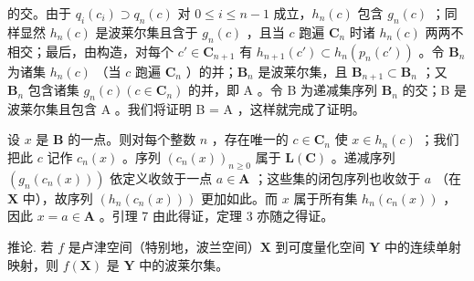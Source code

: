 的交。由于 \(q_{i}(c_{i}) \supset q_{n}(c)\) 对 \(0 \leqslant i \leqslant n - 1\) 成立，\(h_{n}(c)\) 包含 \(g_{n}(c)\) ；同样显然 \(h_{n}(c)\) 是波莱尔集且含于 \(g_{n}(c)\) ，且当 \(c\) 跑遍 \(\mathbf{C}_{n}\) 时诸 \(h_{n}(c)\) 两两不相交；最后，由构造，对每个 \(c' \in \mathbf{C}_{n+1}\) 有 \(h_{n+1}(c') \subset h_n(p_n(c'))\) 。令 \(\mathbf{B}_n\) 为诸集 \(h_n(c)\) （当 \(c\) 跑遍 \(\mathbf{C}_n\) ）的并；\(\mathbf{B}_n\) 是波莱尔集，且 \(\mathbf{B}_{n+1} \subset \mathbf{B}_n\) ；又 \(\mathbf{B}_n\) 包含诸集 \(g_n(c) (c \in \mathbf{C}_n)\) 的并，即 A 。令 B 为递减集序列 \(\mathbf{B}_n\) 的交；B 是波莱尔集且包含 A 。我们将证明 B = A ，这样就完成了证明。

设 \(x\) 是 \(\mathbf{B}\) 的一点。则对每个整数 \(n\) ，存在唯一的 \(c \in \mathbf{C}_n\) 使 \(x \in h_n(c)\) ；我们把此 \(c\) 记作 \(c_n(x)\) 。序列 \((c_n(x))_{n \geqslant 0}\) 属于 \(\mathbf{L}(\mathbf{C})\) 。递减序列 \((g_n(c_n(x)))\) 依定义收敛于一点 \(a \in \mathbf{A}\) ；这些集的闭包序列也收敛于 \(a\) （在 \(\mathbf{X}\) 中），故序列 \((h_n(c_n(x)))\) 更加如此。而 \(x\) 属于所有集 \(h_n(c_n(x))\) ，因此 \(x = a \in \mathbf{A}\) 。引理 7 由此得证，定理 3 亦随之得证。

推论. 若 \(f\) 是卢津空间（特别地，波兰空间）\(\mathbf{X}\) 到可度量化空间 \(\mathbf{Y}\) 中的连续单射映射，则 \(f(\mathbf{X})\) 是 \(\mathbf{Y}\) 中的波莱尔集。

